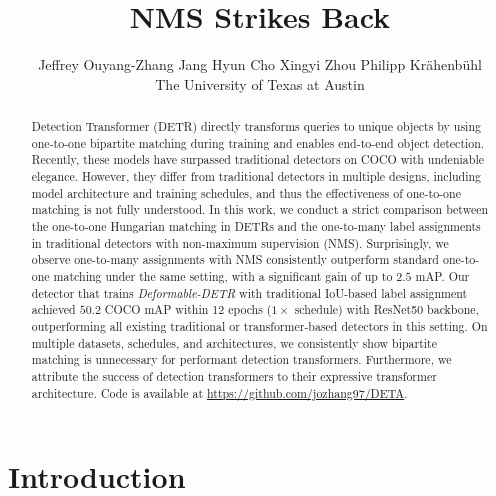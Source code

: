 \documentclass[10pt,twocolumn,letterpaper]{article}
\newcommand{\ddetr}{{\textit{Deformable-DETR}}\xspace}
\begin{document}
\title{NMS Strikes Back}

\author{Jeffrey Ouyang-Zhang \quad
Jang Hyun Cho \quad
Xingyi Zhou \quad 
Philipp Kr\"ahenb\"uhl \vspace{3mm}\\
The University of Texas at Austin
}
\maketitle

\begin{abstract}
Detection Transformer (DETR) directly transforms queries to unique objects by using one-to-one bipartite matching during training and enables end-to-end object detection.
Recently, these models have surpassed traditional detectors on COCO with undeniable elegance.
However, they differ from traditional detectors in multiple designs,
including model architecture and training schedules,
and thus the effectiveness of one-to-one matching is not fully understood.
In this work, we conduct a strict comparison between the one-to-one Hungarian matching in DETRs and the one-to-many label assignments in traditional detectors with non-maximum supervision (NMS).
Surprisingly, we observe one-to-many assignments with NMS consistently outperform standard one-to-one matching under the same setting, with a significant gain of up to $2.5$ mAP.
Our detector that trains \ddetr{} with traditional IoU-based label assignment achieved $50.2$ COCO mAP within 12 epochs ($1\times$ schedule) with ResNet50 backbone, outperforming all existing traditional or transformer-based detectors in this setting.
On multiple datasets, schedules, and architectures, we consistently show bipartite matching is unnecessary for performant detection transformers.
Furthermore, we attribute the success of detection transformers to their expressive transformer architecture.
Code is available at \href{https://github.com/jozhang97/DETA}{https://github.com/jozhang97/DETA}.
\end{abstract}


\section{Introduction}
\end{document}
